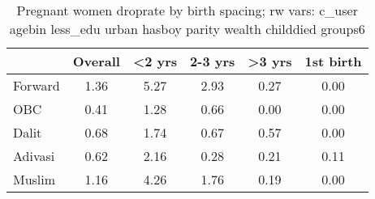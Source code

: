 \begin{table}[htbp]\centering
\caption{Pregnant women droprate by birth spacing; rw vars: c\_user agebin less\_edu urban hasboy parity wealth childdied groups6}
\begin{tabular}{l*{5}{c}}
\toprule
            &\multicolumn{1}{c}{Overall}&\multicolumn{1}{c}{<2 yrs}&\multicolumn{1}{c}{2-3 yrs}&\multicolumn{1}{c}{>3 yrs}&\multicolumn{1}{c}{1st birth}\\
\midrule
\midrule
Forward     &        1.36&        5.27&        2.93&        0.27&        0.00\\
OBC         &        0.41&        1.28&        0.66&        0.00&        0.00\\
Dalit       &        0.68&        1.74&        0.67&        0.57&        0.00\\
Adivasi     &        0.62&        2.16&        0.28&        0.21&        0.11\\
Muslim      &        1.16&        4.26&        1.76&        0.19&        0.00\\
\bottomrule
\end{tabular}
\end{table}
